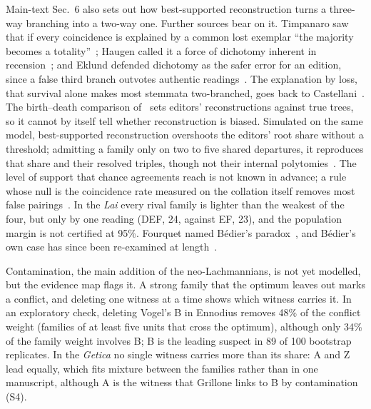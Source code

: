 \documentclass[11pt,a4paper]{article}
\theoremstyle{remark}
\begin{document}
Main-text Sec.~6 also sets out how best-supported reconstruction turns a three-way branching into a two-way one. Further sources bear on it. Timpanaro saw that if every coincidence is explained by a common lost exemplar ``the majority becomes a totality''~\citep[pp.~180--182]{Timpanaro2005}; Haugen called it a force of dichotomy inherent in recension~\citep[pp.~606--608]{Haugen2016}; and Eklund defended dichotomy as the safer error for an edition, since a false third branch outvotes authentic readings~\citep[pp.~37--38, n.~30]{Reeve2011}. The explanation by loss, that survival alone makes most stemmata two-branched, goes back to Castellani~\citep{GuidiTrovato2004,Hoenen2017}. The birth--death comparison of~\citet{Camps2025} sets editors' reconstructions against true trees, so it cannot by itself tell whether reconstruction is biased. Simulated on the same model, best-supported reconstruction overshoots the editors' root share without a threshold; admitting a family only on two to five shared departures, it reproduces that share and their resolved triples, though not their internal polytomies~\citep{StemmaMWIS}. The level of support that chance agreements reach is not known in advance; a rule whose null is the coincidence rate measured on the collation itself removes most false pairings~\citep{StemmaMWIS}. In the \emph{Lai} every rival family is lighter than the weakest of the four, but only by one reading (DEF, 24, against EF, 23), and the population margin is not certified at 95\%. Fourquet named Bédier's paradox~\citep{Fourquet1945}, and Bédier's own case has since been re-examined at length~\citep{Baker2018,Duval2021}.

Contamination, the main addition of the neo-Lachmannians, is not yet modelled, but the evidence map flags it. A strong family that the optimum leaves out marks a conflict, and deleting one witness at a time shows which witness carries it. In an exploratory check, deleting Vogel's B in Ennodius removes 48\% of the conflict weight (families of at least five units that cross the optimum), although only 34\% of the family weight involves B; B is the leading suspect in 89 of 100 bootstrap replicates. In the \emph{Getica} no single witness carries more than its share: A and Z lead equally, which fits mixture between the families rather than in one manuscript, although A is the witness that Grillone links to B by contamination (S4).
\end{document}
